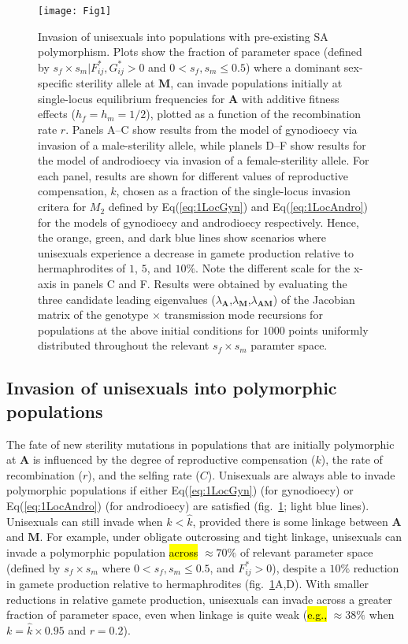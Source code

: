 \documentclass[9pt,twocolumn,twoside,lineno]{gsajnl}
\begin{document}
\begin{figure}[htbp]
\centering
\texttt{[image: Fig1]}
\caption{Invasion of unisexuals into populations with pre-existing SA polymorphism. Plots show the fraction of parameter space (defined by $s_f \times s_m | F^{\ast}_{ij},G^{\ast}_{ij} > 0$ and $0 < s_f,s_m \leq 0.5$) where a dominant sex-specific sterility allele at $\mathbf{M}$, can invade populations initially at single-locus equilibrium frequencies for $\mathbf{A}$ with additive fitness effects ($h_f=h_m=1/2$), plotted as a function of the recombination rate $r$. Panels A--C show results from the model of gynodioecy via invasion of a male-sterility allele, while planels D--F show results for the model of androdioecy via invasion of a female-sterility allele. For each panel, results are shown for different values of reproductive compensation, $k$, chosen as a fraction of the single-locus invasion critera for $M_2$ defined by Eq(\ref{eq:1LocGyn}) and Eq(\ref{eq:1LocAndro}) for the models of gynodioecy and androdioecy respectively. Hence, the orange, green, and dark blue lines show scenarios where unisexuals experience a decrease in gamete production relative to hermaphrodites of $1$, $5$, and $10\%$. Note the different scale for the x-axis in panels C and F. Results were obtained by evaluating the three candidate leading eigenvalues ($\lambda_{\mathbf{A}}$,$\lambda_{\mathbf{M}}$,$\lambda_{\mathbf{AM}}$) of the Jacobian matrix of the genotype $\times$ transmission mode recursions for populations at the above initial conditions for $1000$ points uniformly distributed throughout the relevant $s_f \times s_m$ paramter space.}
\label{fig:PrInv}
\end{figure}

\subsection{Invasion of unisexuals into polymorphic populations}

The fate of new sterility mutations in populations that are initially polymorphic at $\mathbf{A}$ is influenced by the degree of reproductive compensation ($k$), the rate of recombination ($r$), and the selfing rate ($C$). Unisexuals are always able to invade polymorphic populations if either Eq(\ref{eq:1LocGyn}) (for gynodioecy) or Eq(\ref{eq:1LocAndro}) (for androdioecy) are satisfied (fig.~\ref{fig:PrInv}; light blue lines). Unisexuals can still invade when $k < \hat{k}$, provided there is some linkage between $\mathbf{A}$ and $\mathbf{M}$. For example, under obligate outcrossing and tight linkage, unisexuals can invade a polymorphic population \hl{across} $\approx 70\%$ of relevant parameter space (defined by $s_f \times s_m$ where $0 < s_f,s_m \leq 0.5$, and $F^{\ast}_{ij} > 0$), despite a $10\%$ reduction in gamete production relative to hermaphrodites (fig.~\ref{fig:PrInv}A,D). With smaller reductions in relative gamete production, unisexuals can invade across a greater fraction of parameter space, even when linkage is quite weak (\hl{e.g.,} $\approx 38\%$ when $k = \hat{k} \times 0.95 $ and $r = 0.2$). 
\end{document}
